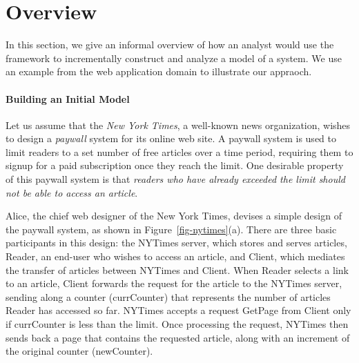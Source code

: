 
\section {Overview}
\label{sec-overview}

In this section, we give an informal overview of how an analyst would
use the framework to incrementally construct and analyze a model of a
system. We use an example from the web application domain to
illustrate our appraoch.

\paragraph{\textbf{Building an Initial Model}} Let us assume that the
\textit{New York Times}, a well-known news organization, wishes to
design a \textit{paywall} system for its online web site. A paywall
system is used to limit readers to a set number of free articles over
a time period, requiring them to signup for a paid subscription once
they reach the limit. One desirable property of this paywall
system is that \textit{readers who have already exceeded the limit
  should not be able to access an article}.

Alice, the chief web designer of the New York Times, devises a simple
design of the paywall system, as shown in
Figure~\ref{fig-nytimes}(a). There are three basic participants in this
design: the \textsf{NYTimes} server, which stores and serves articles,
\textsf{Reader}, an end-user who wishes to access an article, and
\textsf{Client}, which mediates the transfer of articles between
\textsf{NYTimes} and \textsf{Client}. When \textsf{Reader} selects a
link to an article, \textsf{Client} forwards the request for the
article to the \textsf{NYTimes} server, sending along a counter
(\textsf{currCounter}) that represents the number of articles
\textsf{Reader} has accessed so far. \textsf{NYTimes} accepts a
request \textsf{GetPage} from \textsf{Client} only if
\textsf{currCounter} is less than the limit. Once processing the
request, \textsf{NYTimes} then sends back a page that contains the
requested article, along with an increment of the original counter
(\textsf{newCounter}).

